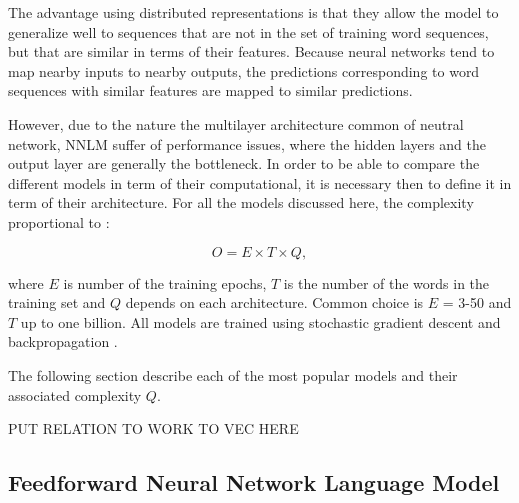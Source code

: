 The advantage  using  distributed representations  is that they allow
the model to generalize well to sequences that are not in the set of training
word sequences, but that are similar in terms of their features. Because neural networks tend to map nearby inputs
to nearby outputs, the predictions corresponding to word sequences with
similar features are mapped to similar predictions. \cite{Bengio:2008,Bengio:2003:NPL:944919.944966}

However, due to the nature the multilayer architecture common of neutral
network, \ac{NNLM}  suffer of 
performance issues, where the hidden layers and the output layer are
generally the bottleneck. In order to be able to compare the different
models in term of their computational, it is necessary then to define it in
term of their architecture. For all the models discussed here, the  complexity proportional to \cite{DBLP:journals/corr/abs-1301-3781}:

\begin{center}
\begin{equation} O = E \times T \times Q,   \end{equation}
\end{center}

where $E$ is number of the training epochs, $T$ is the number of the words in
the training set and $Q$ depends on each architecture. Common choice is $E$ = 3-50 and $T$ up to one billion.
All models are trained using stochastic gradient descent and backpropagation
\cite{Bengio:2003:NPL:944919.944966,DBLP:journals/corr/abs-1301-3781}.

The following section describe each of the most popular models and their
associated complexity $Q$.


PUT RELATION TO WORK TO VEC HERE
\subsection{Feedforward Neural Network Language Model}
\label{subsec:fwd-neural-net-lm}


